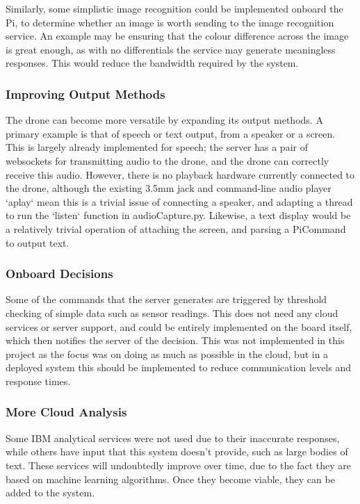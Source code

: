 \documentclass{article}
\begin{document}
Similarly, some simplistic image recognition could be implemented onboard the Pi, to determine whether an image is worth sending to the image recognition service. An example may be ensuring that the colour difference across the image is great enough, as with no differentials the service may generate meaningless responses. This would reduce the bandwidth required by the system.

\subsubsection{Improving Output Methods} \label{OutputMethods}
The drone can become more versatile by expanding its output methods. A primary example is that of speech or text output, from a speaker or a screen. This is largely already implemented for speech; the server has a pair of websockets for transmitting audio to the drone, and the drone can correctly receive this audio. However, there is no playback hardware currently connected to the drone, although the existing 3.5mm jack and command-line audio player `aplay` mean this is a trivial issue of connecting a speaker, and adapting a thread to run the `listen` function in audioCapture.py. Likewise, a text display would be a relatively trivial operation of attaching the screen, and parsing a PiCommand to output text. 

\subsubsection{Onboard Decisions}
Some of the commands that the server generates are triggered by threshold checking of simple data such as sensor readings. This does not need any cloud services or server support, and could be entirely implemented on the board itself, which then notifies the server of the decision. This was not implemented in this project as the focus was on doing as much as possible in the cloud, but in a deployed system this should be implemented to reduce communication levels and response times. 

\subsubsection{More Cloud Analysis}
Some IBM analytical services were not used due to their inaccurate responses, while others have input that this system doesn't provide, such as large bodies of text. These services will undoubtedly improve over time, due to the fact they are based on machine learning algorithms. Once they become viable, they can be added to the system.
 
\end{document}
